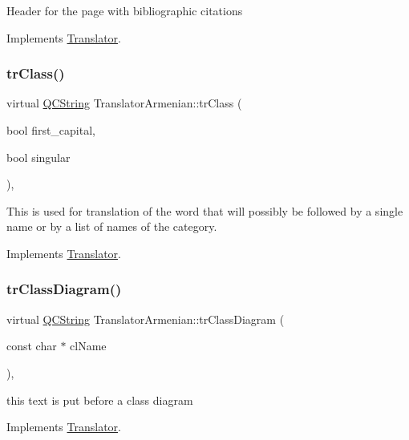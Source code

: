 Header for the page with bibliographic citations 

Implements \mbox{\hyperlink{class_translator}{Translator}}.

\mbox{\label{class_translator_armenian_ac9f648e30b0dd5d2108a9249ded45dd3}} 
\subsubsection{\texorpdfstring{trClass()}{trClass()}}
{\footnotesize\ttfamily virtual \mbox{\hyperlink{class_q_c_string}{Q\+C\+String}} Translator\+Armenian\+::tr\+Class (\begin{DoxyParamCaption}\item[{bool}]{first\+\_\+capital,  }\item[{bool}]{singular }\end{DoxyParamCaption})\hspace{0.3cm}{\ttfamily [inline]}, {\ttfamily [virtual]}}

This is used for translation of the word that will possibly be followed by a single name or by a list of names of the category. 

Implements \mbox{\hyperlink{class_translator}{Translator}}.

\mbox{\label{class_translator_armenian_ab8a6f09fcffcf67d9864335c87404f69}} 
\subsubsection{\texorpdfstring{trClassDiagram()}{trClassDiagram()}}
{\footnotesize\ttfamily virtual \mbox{\hyperlink{class_q_c_string}{Q\+C\+String}} Translator\+Armenian\+::tr\+Class\+Diagram (\begin{DoxyParamCaption}\item[{const char $\ast$}]{cl\+Name }\end{DoxyParamCaption})\hspace{0.3cm}{\ttfamily [inline]}, {\ttfamily [virtual]}}

this text is put before a class diagram 

Implements \mbox{\hyperlink{class_translator}{Translator}}.

